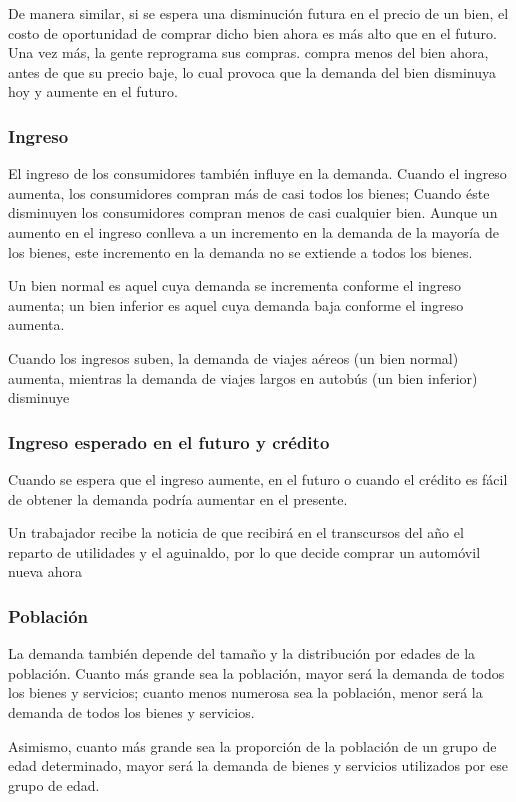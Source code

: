 De manera similar, si se espera una disminución futura en el precio de un bien, el costo de oportunidad de comprar dicho bien ahora es más alto que en el futuro. Una vez más, la gente reprograma sus compras. compra menos del bien ahora, antes de que su precio baje, lo cual provoca que la demanda del bien disminuya hoy y aumente en el futuro.

\subsubsection{Ingreso}
El ingreso de los consumidores también influye en la demanda. Cuando el ingreso aumenta, los consumidores compran más de casi todos los bienes; Cuando éste disminuyen los consumidores compran menos de casi cualquier bien. Aunque un aumento en el ingreso conlleva a un incremento en la demanda de la mayoría de los bienes, este incremento en la demanda no se extiende a todos los bienes.

Un bien normal es aquel cuya demanda se incrementa conforme el ingreso aumenta; un bien inferior es aquel cuya demanda baja conforme el ingreso aumenta.
\begin{example}
    Cuando los ingresos suben, la demanda de viajes aéreos (un bien normal) aumenta, mientras la demanda de viajes largos en autobús (un bien inferior) disminuye
\end{example}
\subsubsection{Ingreso esperado en el futuro y crédito}
    Cuando se espera que el ingreso aumente, en el futuro o cuando el crédito es fácil de obtener la demanda podría aumentar en el presente.
\begin{example}
    Un trabajador recibe la noticia de que recibirá en el transcursos del año el reparto de utilidades y el aguinaldo, por lo que decide comprar un automóvil nueva ahora
\end{example}

\subsubsection{Población}
La demanda también depende del tamaño y la distribución por edades de la población. Cuanto más grande sea la población, mayor será la demanda de todos los bienes y servicios; cuanto menos numerosa sea la población, menor será la demanda de todos los bienes y servicios.

Asimismo, cuanto más grande sea la proporción de la población de un grupo de edad determinado, mayor será la demanda de bienes y servicios utilizados por ese grupo de edad. 
